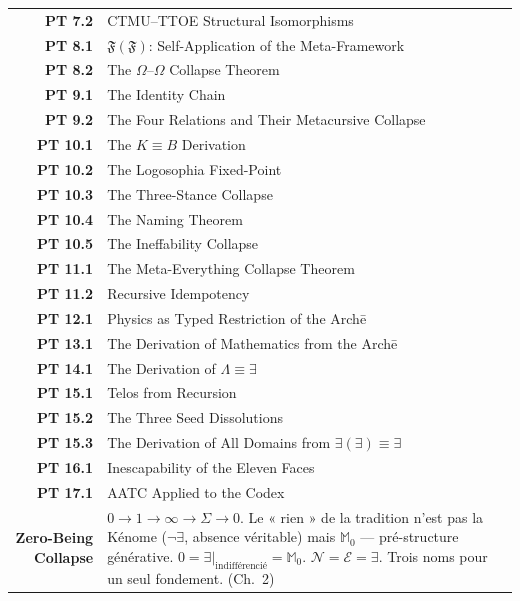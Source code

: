 \documentclass[10pt, openany, oneside]{book}
\begin{document}
{\begin{tabular}{r p{}}
\textbf{PT 7.2} & CTMU--TTOE Structural Isomorphisms \\[0.2em]
\textbf{PT 8.1} & $\mathfrak{F}(\mathfrak{F})$: Self-Application of the Meta-Framework \\[0.2em]
\textbf{PT 8.2} & The $\Omega$--$\Omega$ Collapse Theorem \\[0.2em]
\textbf{PT 9.1} & The Identity Chain \\[0.2em]
\textbf{PT 9.2} & The Four Relations and Their Metacursive Collapse \\[0.2em]
\textbf{PT 10.1} & The $K \equiv B$ Derivation \\[0.2em]
\textbf{PT 10.2} & The Logosophia Fixed-Point \\[0.2em]
\textbf{PT 10.3} & The Three-Stance Collapse \\[0.2em]
\textbf{PT 10.4} & The Naming Theorem \\[0.2em]
\textbf{PT 10.5} & The Ineffability Collapse \\[0.2em]
\textbf{PT 11.1} & The Meta-Everything Collapse Theorem \\[0.2em]
\textbf{PT 11.2} & Recursive Idempotency \\[0.2em]
\textbf{PT 12.1} & Physics as Typed Restriction of the Arch\={e} \\[0.2em]
\textbf{PT 13.1} & The Derivation of Mathematics from the Arch\={e} \\[0.2em]
\textbf{PT 14.1} & The Derivation of $\Lambda \equiv \exists$ \\[0.2em]
\textbf{PT 15.1} & Telos from Recursion \\[0.2em]
\textbf{PT 15.2} & The Three Seed Dissolutions \\[0.2em]
\textbf{PT 15.3} & The Derivation of All Domains from $\exists(\exists) \equiv \exists$ \\[0.2em]
\textbf{PT 16.1} & Inescapability of the Eleven Faces \\[0.2em]
\textbf{PT 17.1} & AATC Applied to the Codex \\[0.2em]
\textbf{Zero-Being Collapse} & $0 \to 1 \to \infty \to \Sigma \to 0$. Le « rien » de la tradition n'est pas la Kénome ($\neg\exists$, absence véritable) mais $\mathbb{M}_0$ --- pré-structure générative. $0 = \exists|_{\text{indifférencié}} = \mathbb{M}_0$. $\mathcal{N} = \mathcal{E} = \exists$. Trois noms pour un seul fondement. (Ch.\ 2) \\[0.3em]
\end{tabular}
}

\vspace{2em}
\end{document}
